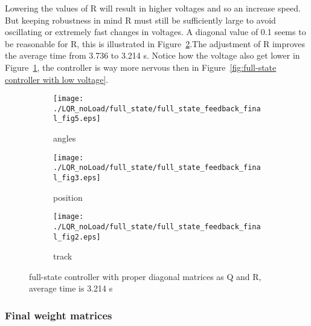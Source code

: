 Lowering the values of R  will result in higher voltages and so an increase speed. But keeping robustness in mind R must still be sufficiently large to avoid oscillating or extremely fast changes in voltages. A diagonal value of 0.1 seems to be reasonable for R, this is illustrated in Figure~\ref{fig:full-state controller with proper diagonal matrices as Q and R}.The adjustment of R improves the average time from 3.736 to 3.214 s. Notice how the voltage also get lower in Figure~\ref{fig:full-state controller with proper diagonal matrices as Q and R - voltages}, the controller is way more nervous then in Figure~\ref{fig:full-state controller with low voltage}.
\begin{figure}[H]
	\centering
	\begin{subfigure}[b]{0.3\textwidth}
		\texttt{[image: ./LQR\_noLoad/full\_state/full\_state\_feedback\_final\_fig5.eps]}
		\caption{angles}
		\label{fig:full-state controller with proper diagonal matrices as Q and R - voltages}
	\end{subfigure}
	\begin{subfigure}[b]{0.3\textwidth}
		\texttt{[image: ./LQR\_noLoad/full\_state/full\_state\_feedback\_final\_fig3.eps]}
		\caption{position}
	\end{subfigure}
	\begin{subfigure}[b]{0.3\textwidth}
		\texttt{[image: ./LQR\_noLoad/full\_state/full\_state\_feedback\_final\_fig2.eps]}
		\caption{track}
	\end{subfigure}
	\caption{full-state controller with proper diagonal matrices as Q and R, average time is 3.214 s}\label{fig:full-state controller with proper diagonal matrices as Q and R}
\end{figure}
\subsubsection{Final weight matrices}

